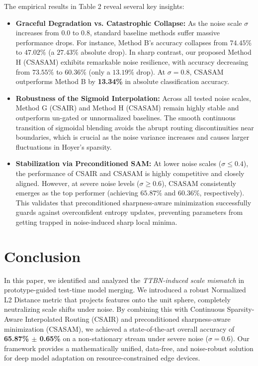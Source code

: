 \documentclass{article}
\theoremstyle{plain}
\theoremstyle{definition}
\theoremstyle{remark}
\begin{document}
The empirical results in Table 2 reveal several key insights:
\begin{itemize}
    \item \textbf{Graceful Degradation vs. Catastrophic Collapse:} As the noise scale $\sigma$ increases from $0.0$ to $0.8$, standard baseline methods suffer massive performance drops. For instance, Method B's accuracy collapses from $74.45\%$ to $47.02\%$ (a $27.43\%$ absolute drop). In sharp contrast, our proposed Method H (CSASAM) exhibits remarkable noise resilience, with accuracy decreasing from $73.55\%$ to $60.36\%$ (only a $13.19\%$ drop). At $\sigma = 0.8$, CSASAM outperforms Method B by \textbf{13.34\%} in absolute classification accuracy.
    \item \textbf{Robustness of the Sigmoid Interpolation:} Across all tested noise scales, Method G (CSAIR) and Method H (CSASAM) remain highly stable and outperform un-gated or unnormalized baselines. The smooth continuous transition of sigmoidal blending avoids the abrupt routing discontinuities near boundaries, which is crucial as the noise variance increases and causes larger fluctuations in Hoyer's sparsity.
    \item \textbf{Stabilization via Preconditioned SAM:} At lower noise scales ($\sigma \le 0.4$), the performance of CSAIR and CSASAM is highly competitive and closely aligned. However, at severe noise levels ($\sigma \ge 0.6$), CSASAM consistently emerges as the top performer (achieving $65.87\%$ and $60.36\%$, respectively). This validates that preconditioned sharpness-aware minimization successfully guards against overconfident entropy updates, preventing parameters from getting trapped in noise-induced sharp local minima.
\end{itemize}

\section{Conclusion}
\label{sec:conclusion}

In this paper, we identified and analyzed the \emph{TTBN-induced scale mismatch} in prototype-guided test-time model merging. We introduced a robust Normalized L2 Distance metric that projects features onto the unit sphere, completely neutralizing scale shifts under noise. By combining this with Continuous Sparsity-Aware Interpolated Routing (CSAIR) and preconditioned sharpness-aware minimization (CSASAM), we achieved a state-of-the-art overall accuracy of \textbf{65.87\% $\pm$ 0.65\%} on a non-stationary stream under severe noise ($\sigma=0.6$). Our framework provides a mathematically unified, data-free, and noise-robust solution for deep model adaptation on resource-constrained edge devices.

\nocite{*}


\end{document}
